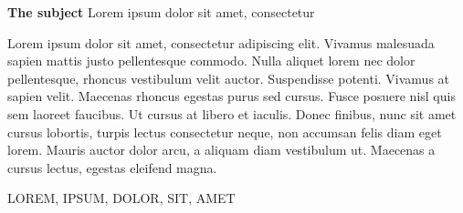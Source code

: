 \textbf{The subject} Lorem ipsum dolor sit amet, consectetur



Lorem ipsum dolor sit amet, consectetur adipiscing elit. Vivamus malesuada sapien mattis justo pellentesque commodo. 
Nulla aliquet lorem nec dolor pellentesque, rhoncus vestibulum velit auctor. Suspendisse potenti. Vivamus at sapien velit.
 Maecenas rhoncus egestas purus sed cursus. Fusce posuere nisl quis sem laoreet faucibus. Ut cursus at libero et iaculis. 
 Donec finibus, nunc sit amet cursus lobortis, turpis lectus consectetur neque, non accumsan felis diam eget lorem. Mauris 
 auctor dolor arcu, a aliquam diam vestibulum ut. Maecenas a cursus lectus, egestas eleifend magna.
 
 




\MakeUppercase{Lorem, ipsum, dolor, sit, amet}